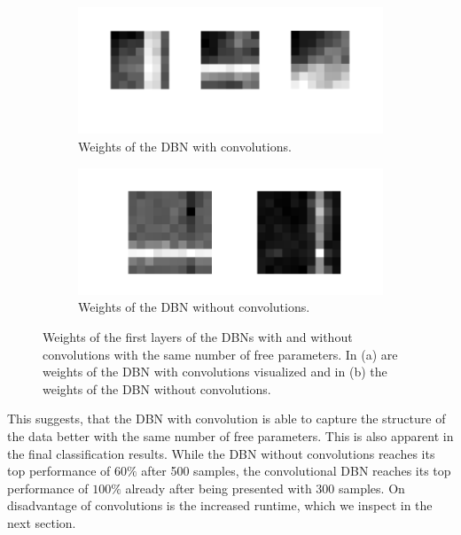 \begin{figure}[h!]
	\centering
	\begin{subfigure}[t]{.45\textwidth}
  		\centering
  		\includegraphics[width=.9\linewidth]{imgs/cvsnc/wc.png}
  		\caption{Weights of the DBN with convolutions.}
  		\label{fig:sub1}
	\end{subfigure}%
	\begin{subfigure}[t]{.45\textwidth}
  		\centering
  		\includegraphics[width=.9\linewidth]{imgs/cvsnc/wnc.png}
  		\caption{Weights of the DBN without convolutions.}
  		\label{fig:sub2}
	\end{subfigure}
	\caption[Weights of the first layers of the DBNs with and without convolutions with the same number of free parameters.]{Weights of the first layers of the DBNs with and without convolutions with the same number of free parameters. In (a) are weights of the DBN with convolutions visualized and in (b) the weights of the DBN without convolutions.}
	\label{fig:wwoconwconv}
\end{figure}


This suggests, that the DBN with convolution is able to capture the structure of the data better with the same number of free parameters. 
This is also apparent in the final classification results.
While the DBN without convolutions reaches its top performance of $60 \%$ after 500 samples, the convolutional DBN reaches its top performance of $100 \%$ already after being presented with 300 samples.
On disadvantage of convolutions is the increased runtime, which we inspect in the next section.

